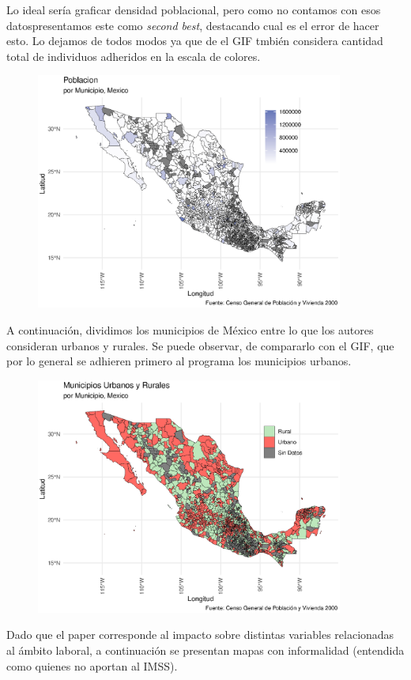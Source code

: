 \documentclass[9pt]{article}
\begin{document}
 Lo ideal ser\'ia graficar densidad poblacional, pero como no contamos con esos datospresentamos este como \textit{second best}, destacando cual es el error de hacer esto.  Lo dejamos de todos modos ya que de el GIF tmbi\'en considera cantidad total de individuos adheridos en la escala de colores. 
   \begin{figure}[H]
     \centering
     \includegraphics[width=0.9\textwidth]{figs/populationb.eps}
 \end{figure}
 A continuaci\'on, dividimos los municipios de M\'exico entre lo que los autores consideran urbanos y rurales. Se puede observar, de compararlo con el GIF, que por lo general se adhieren primero al programa los municipios urbanos. 
    \begin{figure}[H]
     \centering
     \includegraphics[width=0.9\textwidth]{figs/Urbanos y Rurales.eps}
 \end{figure}
\newpage Dado que el paper corresponde al impacto sobre distintas variables relacionadas al ámbito laboral, a continuación se presentan mapas con informalidad (entendida como quienes no aportan al IMSS). 
\end{document}
